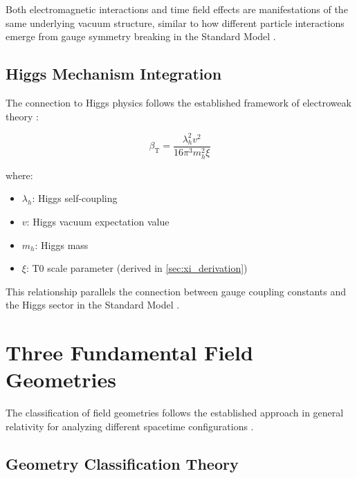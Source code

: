 \documentclass[12pt,a4paper]{article}
\newcommand{\betaT}{\beta_{\text{T}}}
\begin{document}
	\begin{tcolorbox}[colback=blue!5!white,colframe=blue!75!black,title=Vacuum Structure Unity]
		Both electromagnetic interactions and time field effects are manifestations of the same underlying vacuum structure, similar to how different particle interactions emerge from gauge symmetry breaking in the Standard Model \citep{weinberg2003,peskin1995}.
	\end{tcolorbox}
	
	\subsection{Higgs Mechanism Integration}
	\label{subsec:higgs_mechanism}
	
	The connection to Higgs physics follows the established framework of electroweak theory \citep{higgs1964,englert1964,weinberg1967,salam1968}:
	
	\begin{equation}
		\label{eq:higgs_connection}
		\betaT = \frac{\lambda_h^2 v^2}{16\pi^3 m_h^2 \xi}
	\end{equation}
	
	where:
	\begin{itemize}
		\item $\lambda_h$: Higgs self-coupling \citep{djouadi2008}
		\item $v$: Higgs vacuum expectation value \citep{weinberg2003}
		\item $m_h$: Higgs mass \citep{aad2012,chatrchyan2012}
		\item $\xi$: T0 scale parameter (derived in \cref{sec:xi_derivation})
	\end{itemize}
	
	This relationship parallels the connection between gauge coupling constants and the Higgs sector in the Standard Model \citep{peskin1995,weinberg2003}.
	
	\section{Three Fundamental Field Geometries}
	\label{sec:three_geometries}
	
	The classification of field geometries follows the established approach in general relativity for analyzing different spacetime configurations \citep{hawking1973,wald1984}.
	
	\subsection{Geometry Classification Theory}
	\label{subsec:geometry_theory}
	
\end{document}
